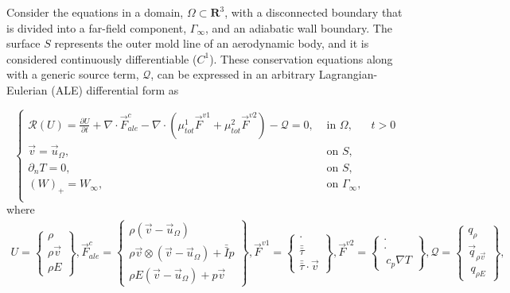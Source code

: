 Consider the equations in a domain, $\Omega \subset \mathbf{R}^3$, with a disconnected boundary that is divided into a far-field component, $\Gamma_\infty$, and an adiabatic wall boundary. The surface $S$ represents the outer mold line of an aerodynamic body, and it is considered continuously differentiable ($C^1$). These conservation equations along with a generic source term, $\mathcal{Q} $, can be expressed in an arbitrary Lagrangian-Eulerian (ALE) differential form as

\begin{equation} 
\label{rans}
\left\{\begin{array} {lll}
\mathcal{R}(U) = \frac{\partial U}{\partial t} + \nabla \cdot \vec{F}^{c}_{ale} -  \nabla \cdot ( \mu_{tot}^{1}\vec{F}^{v1} + \mu_{tot}^{2}\vec{F}^{v2}) - \mathcal{Q} = 0, & \mbox{  in } \Omega, & t > 0  \\
\vec{v} = \vec{u}_\Omega, &  \mbox{ on }  S,  \\
\partial_n T = 0, &  \mbox{ on }  S,   \\
(W)_+ = W_\infty,  & \mbox{ on }  \Gamma_\infty, \\
\end{array}\right.
\end{equation}
where
\begin{align} 
\label{euler_f}
U = \left \{ \begin{array}{c} \rho \\ \rho \vec{v} \\ \rho E \end{array} \right \},
\vec{F}^{c}_{ale} = \left \{ \begin{array}{c} \rho (\vec{v} - \vec{u}_\Omega)  \\ \rho \vec{v} \otimes  (\vec{v} - \vec{u}_\Omega) + \bar{\bar{I}} p \\ \rho E (\vec{v} - \vec{u}_\Omega) + p \vec{v}   \end{array} \right \},
\vec{F}^{v1} = \left \{ \begin{array}{c} \cdot \\ \bar{\bar{\tau}} \\ \bar{\bar{\tau}} \cdot \vec{v}  \end{array} \right  \},
\vec{F}^{v2} = \left \{ \begin{array}{c} \cdot \\ \cdot \\ \ c_p \nabla T   \end{array} \right \}, 
\mathcal{Q} = \left \{ \begin{array}{c} q_{\rho} \\ \vec{q}_{\rho \vec{v}} \\ \ q_{\rho E}   \end{array} \right \},
\end{align}
